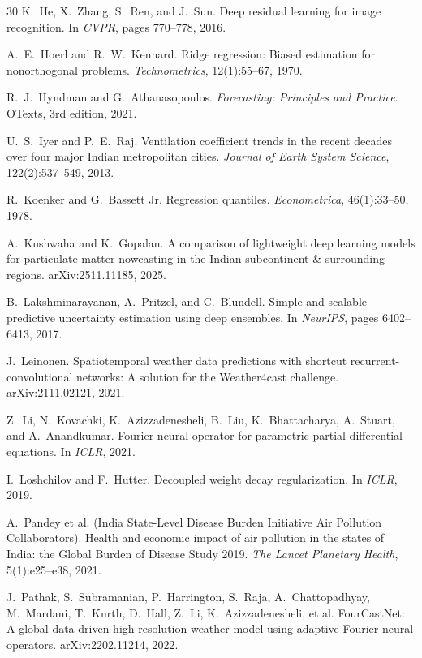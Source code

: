\documentclass[10pt]{article}
\begin{document}
\begin{thebibliography}{30}
 K.~He, X.~Zhang, S.~Ren, and J.~Sun. Deep residual learning for image recognition. In \emph{CVPR}, pages 770--778, 2016.

 A.~E.~Hoerl and R.~W.~Kennard. Ridge regression: Biased estimation for nonorthogonal problems. \emph{Technometrics}, 12(1):55--67, 1970.

 R.~J.~Hyndman and G.~Athanasopoulos. \emph{Forecasting: Principles and Practice}. OTexts, 3rd edition, 2021.

 U.~S.~Iyer and P.~E.~Raj. Ventilation coefficient trends in the recent decades over four major Indian metropolitan cities. \emph{Journal of Earth System Science}, 122(2):537--549, 2013.

 R.~Koenker and G.~Bassett Jr. Regression quantiles. \emph{Econometrica}, 46(1):33--50, 1978.

 A.~Kushwaha and K.~Gopalan. A comparison of lightweight deep learning models for particulate-matter nowcasting in the Indian subcontinent \& surrounding regions. arXiv:2511.11185, 2025.

 B.~Lakshminarayanan, A.~Pritzel, and C.~Blundell. Simple and scalable predictive uncertainty estimation using deep ensembles. In \emph{NeurIPS}, pages 6402--6413, 2017.

 J.~Leinonen. Spatiotemporal weather data predictions with shortcut recurrent-convolutional networks: A solution for the Weather4cast challenge. arXiv:2111.02121, 2021.

 Z.~Li, N.~Kovachki, K.~Azizzadenesheli, B.~Liu, K.~Bhattacharya, A.~Stuart, and A.~Anandkumar. Fourier neural operator for parametric partial differential equations. In \emph{ICLR}, 2021.

 I.~Loshchilov and F.~Hutter. Decoupled weight decay regularization. In \emph{ICLR}, 2019.

 A.~Pandey et al. (India State-Level Disease Burden Initiative Air Pollution Collaborators). Health and economic impact of air pollution in the states of India: the Global Burden of Disease Study 2019. \emph{The Lancet Planetary Health}, 5(1):e25--e38, 2021.

 J.~Pathak, S.~Subramanian, P.~Harrington, S.~Raja, A.~Chattopadhyay, M.~Mardani, T.~Kurth, D.~Hall, Z.~Li, K.~Azizzadenesheli, et al. FourCastNet: A global data-driven high-resolution weather model using adaptive Fourier neural operators. arXiv:2202.11214, 2022.


\end{thebibliography}
\end{document}
